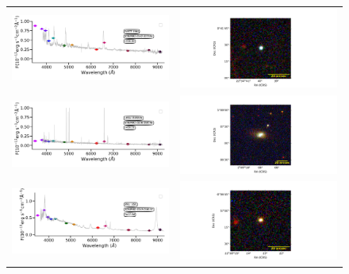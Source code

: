 \documentclass[fleqn,usenatbib]{mnras}
\begin{document}
\begin{figure}
\begin{tabular}{ll}
    \includegraphics[trim=10 0 10 20, clip]{Figs/spec-0376-52143-0631-STRIPE82-0142-027354.pdf} & \includegraphics[width=0.4\linewidth, trim=10 0 10 20, clip]{Figs/FASTT1560_338-0_100_r.pdf} \\
     \includegraphics[trim=10 0 10 20, clip]{Figs/spec-0397-51794-0336-STRIPE82-0026-058736.pdf} & \includegraphics[width=0.4\linewidth, trim=10 0 10 20, clip]{Figs/LEDA1185205_17-1_200_r.pdf} \\
     \includegraphics[trim=10 0 10 20, clip]{Figs/spec-9217-57934-0839-STRIPE82-0143-016137.pdf} & \includegraphics[width=0.4\linewidth, trim=10 0 10 20, clip]{Figs/PHL354_339-0_100_r.pdf} \\

\end{tabular}
\end{figure}
\end{document}
